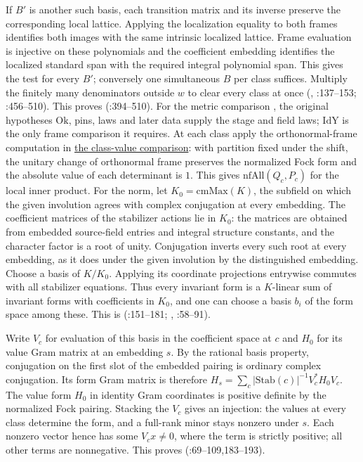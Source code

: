 If $B'$ is another such basis, each transition matrix and its
inverse preserve the corresponding local lattice. Applying the
localization equality to both frames identifies both images with the
same intrinsic localized lattice. Frame evaluation is injective on
these polynomials and the coefficient embedding identifies the
localized standard span with the required integral polynomial span.
This gives the test for every $B'$; conversely one simultaneous $B$
per class suffices. Multiply the finitely many denominators outside
$w$ to clear every class at once
(, :137--153;
:456--510).
This proves 
(:394--510).
For the metric comparison , the original hypotheses
$\mathrm{Ok}$, pins, laws and later data supply the stage and field laws;
$\mathrm{IdY}$ is the only frame comparison it requires. At each class
apply the orthonormal-frame computation in
\hyperref[r13:s9-values]{the class-value comparison}: with partition fixed under the shift, the unitary
change of orthonormal frame preserves the normalized Fock form and the
absolute value of each determinant is $1$. This gives
$\mathrm{nfAll}(Q_c,P_c)$ for the local inner product.
For the norm, let $K_0=\mathrm{cmMax}(K)$, the subfield on which
the given involution agrees with complex conjugation at every embedding.
The coefficient matrices of the stabilizer actions lie in $K_0$:
the matrices are obtained from embedded source-field entries and integral
structure constants, and the character factor is a root of unity.
Conjugation inverts every such root at every embedding, as it does under
the given involution by the distinguished embedding. Choose a basis of
$K/K_0$. Applying its coordinate projections entrywise commutes with
all stabilizer equations. Thus every invariant form is a $K$-linear sum
of invariant forms with coefficients in $K_0$, and one can choose a
basis $b_i$ of the form space among these. This is
 (:151--181;
, :58--91).

Write $V_c$ for evaluation of this basis in the coefficient space at $c$
and $H_0$ for its value Gram matrix at an embedding $s$. By the rational
basis property, conjugation on the first slot of the embedded pairing
is ordinary complex conjugation. Its form Gram matrix is therefore
$H_s=\sum_c |\mathrm{Stab}(c)|^{-1} V_c^*H_0 V_c$. The value form
$H_0$ in identity Gram coordinates is positive definite by the normalized
Fock pairing. Stacking the $V_c$ gives an injection: the values at every
class determine the form, and a full-rank minor stays nonzero under $s$.
Each nonzero vector hence has some $V_c x\ne0$, where the term is
strictly positive; all other terms are nonnegative. This proves
(:69--109,183--193).

